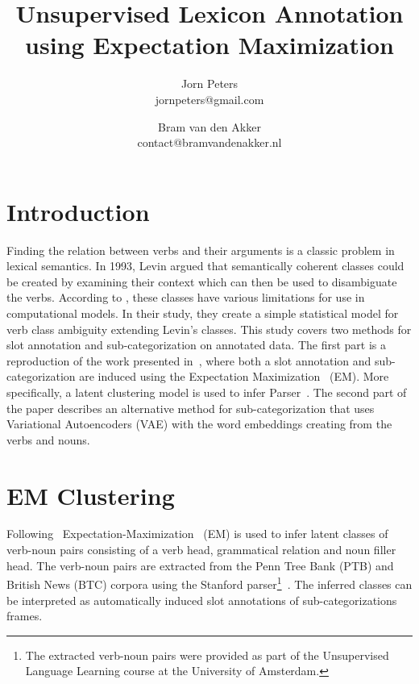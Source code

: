 \documentclass[11pt]{scrartcl}
\title{Unsupervised Lexicon Annotation using Expectation Maximization}
\author{Jorn Peters\\\small{jornpeters@gmail.com} \and Bram van den Akker\\\small{contact@bramvandenakker.nl}}
\begin{document}
\maketitle


\section{Introduction} %
Finding the relation between verbs and their arguments is a classic
problem in lexical semantics. In 1993, Levin \cite{levin1993english}
argued that semantically coherent classes could be created by
examining their context which can then be used to disambiguate the
verbs. According to \cite{lapata2004verb}, these classes have various
limitations for use in computational models. In their study, they
create a simple statistical model for verb class ambiguity extending
Levin's classes. This study covers two methods for slot annotation and
sub-categorization on annotated data. The first part is a reproduction
of the work presented in~\cite{rooth1999inducing}, where both a slot
annotation and sub-categorization are induced using the Expectation
Maximization~\cite{dempster1977maximum} (EM). More specifically, a
latent clustering model is used to infer
Parser~\cite{klein2003accurate}. The second part of the paper
describes an alternative method for sub-categorization that uses
Variational Autoencoders (VAE) with the word embeddings creating from
the verbs and nouns.

\section{EM Clustering} %
Following~\cite{rooth1999inducing}
Expectation-Maximization~\cite{dempster1977maximum} (EM) is used to
infer latent classes of verb-noun pairs consisting of a verb head, grammatical relation and noun filler head. The verb-noun pairs are
extracted from the Penn Tree Bank (PTB) and British News (BTC) corpora
using the Stanford parser\footnote{The extracted verb-noun pairs were
provided as part of the Unsupervised Language Learning course at the
University of Amsterdam.}~\cite{klein2003accurate}.  The inferred
classes can be interpreted as automatically induced slot annotations
of sub-categorizations frames.
\end{document}

